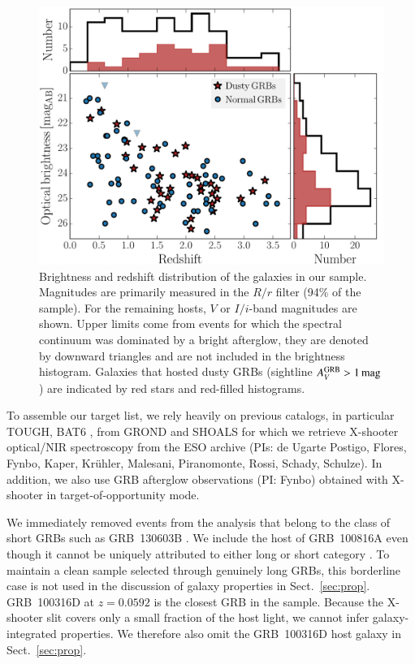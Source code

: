 \documentclass[traditabstract, longauth]{aa}
\begin{document}
\begin{figure}
\includegraphics[angle=0, width=0.99\columnwidth]{Figs/Brightness.pdf}
\caption{Brightness and redshift distribution of the galaxies in our sample. Magnitudes are primarily measured in the $R/r$ filter (94\% of the sample). For the remaining hosts, $V$ or $I/i$-band magnitudes are shown. {Upper limits come from events for which the spectral continuum was dominated by a bright afterglow, they are denoted by downward triangles and are not included in the brightness histogram. Galaxies that hosted dusty GRBs (sightline $A^{\rm{GRB}}_V>1\,\rm{mag}$) are indicated by red stars and red-filled histograms.}}
\label{fig:brightness}
\end{figure}

 {To assemble our target list, we rely heavily on previous catalogs, in particular TOUGH, BAT6 \citep{2012ApJ...749...68S}, from GROND \citep{2011A&A...526A..30G, 2011A&A...534A.108K} and SHOALS} for which we retrieve X-shooter optical/NIR spectroscopy from the ESO archive (PIs: de Ugarte Postigo, Flores, Fynbo, Kaper, Kr\"uhler, Malesani, Piranomonte, Rossi, Schady, Schulze). In addition, we also use GRB afterglow observations (PI: Fynbo) obtained with X-shooter in target-of-opportunity mode. 

We immediately removed events from the analysis that belong to the class of short GRBs such as GRB~130603B \citep[e.g.,][]{2014A&A...563A..62D}. We include the host of GRB~100816A even though it cannot be uniquely attributed to either long or short category \citep{2010GCNR..300....1O}. To maintain a clean sample selected through genuinely long GRBs, this borderline case is not used in the discussion of galaxy properties in Sect.~\ref{sec:prop}. GRB~100316D at $z=0.0592$ \citep[e.g.,][]{2011MNRAS.411.2792S, 2012ApJ...753...67B} is the closest GRB in the sample. Because the X-shooter slit covers only a small fraction of the host light, we cannot infer galaxy-integrated properties. We therefore also omit the GRB~100316D host galaxy in Sect.~\ref{sec:prop}.
\end{document}
